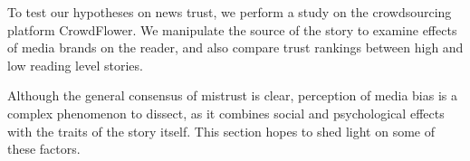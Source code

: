 To test our hypotheses on news trust, we perform a study on the crowdsourcing platform CrowdFlower. We manipulate the source of the story to examine effects of media brands on the reader, and also compare trust rankings between high and low reading level stories.



Although the general consensus of mistrust is clear, perception of media bias is a complex phenomenon to dissect, as it combines social and psychological effects with the traits of the story itself. This section hopes to shed light on some of these factors.

%  